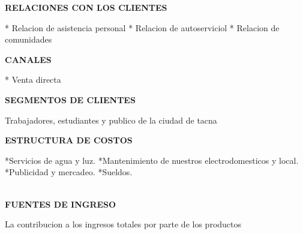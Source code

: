 \begin{enumerate}[1.]
\begin{center}
\textbf {RELACIONES CON LOS CLIENTES} \newline
\end{center}
* Relacion de asistencia personal\newline
* Relacion de autoserviciol\newline
* Relacion de comunidades\newline
\\ 

\begin{center}
\textbf {CANALES} \newline
\end{center}
* Venta directa\newline
\\ 

\begin{center}
\textbf {SEGMENTOS DE CLIENTES} \newline
\end{center}
Trabajadores, estudiantes y publico de la ciudad de tacna  \newline
\\ 
\begin{center}
\textbf {ESTRUCTURA DE COSTOS} \newline
\end{center}
*Servicios de agua y luz.  \newline
*Mantenimiento de nuestros electrodomesticos y local.  \newline
*Publicidad y mercadeo.  \newline
*Sueldos.  \newline
\\ 

\\ 
\begin{center}
\textbf {FUENTES DE INGRESO} \newline
\end{center}
La contribucion a los ingresos totales por parte de los productos  \newline
\\ 


\end{enumerate}
